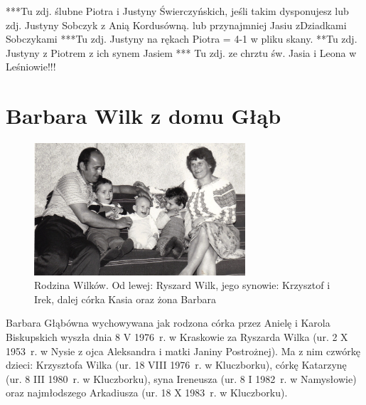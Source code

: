 ***Tu zdj. ślubne Piotra i Justyny Świerczyńskich, jeśli takim dysponujesz lub zdj. Justyny Sobczyk z Anią Kordusówną. lub przynajmniej Jasiu zDziadkami Sobczykami
***Tu zdj. Justyny na rękach Piotra = 4-1 w pliku skany.
**Tu zdj. Justyny z Piotrem z ich synem Jasiem
*** Tu zdj. ze chrztu św. Jasia i Leona w Leśniowie!!!



\section{Barbara Wilk z domu Głąb}

\begin{figure}[!h]
\begin{center}
\includegraphics[width=0.7\textwidth]{zdjecia/barbara_i_ryszard_wilk_z_dziecmi.jpg}
\caption[Barbara i Ryszard Wilkowie z dziećmi]{Rodzina Wilków. Od lewej: Ryszard Wilk, jego synowie: Krzysztof i Irek, dalej córka Kasia oraz żona Barbara}
\label{rys:barbara_i_ryszard_wilk_z_dziecmi}
\end{center}
\end{figure}

Barbara Głąbówna wychowywana jak rodzona córka przez Anielę i Karola Biskupskich wyszła dnia 8 V 1976~r. w Kraskowie za Ryszarda Wilka (ur. 2 X 1953~r. w Nysie z ojca Aleksandra i matki Janiny Postrożnej). Ma z nim czwórkę dzieci: Krzysztofa Wilka (ur. 18 VIII 1976~r. w Kluczborku), córkę Katarzynę (ur. 8 III 1980~r. w Kluczborku), syna Ireneusza (ur. 8 I 1982~r. w Namysłowie) oraz najmłodszego Arkadiusza (ur. 18 X 1983~r. w Kluczborku).


